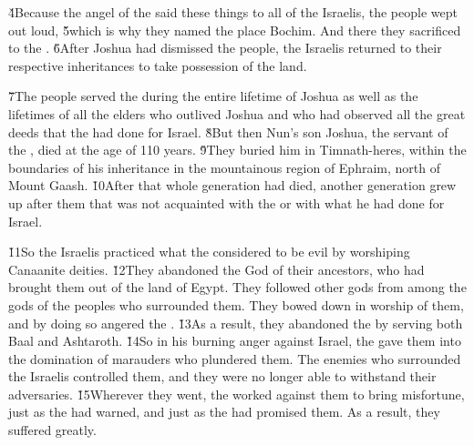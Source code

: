 \v{4}Because the angel of the  said these things to all of the Israelis, the people wept out loud, \v{5}which is why they named the place Bochim. And there they sacrificed to the . \v{6}After Joshua had dismissed the people, the Israelis returned to their respective inheritances to take possession of the land.

\v{7}The people served the  during the entire lifetime of Joshua as well as the lifetimes of all the elders who outlived Joshua and who had observed all the great deeds that the  had done for Israel. \v{8}But then Nun's son Joshua, the servant of the , died at the age of 110 years. \v{9}They buried him in Timnath-heres, within the boundaries of his inheritance in the mountainous region of Ephraim, north of Mount Gaash. \v{10}After that whole generation had died, another generation grew up after them that was not acquainted with the  or with what he had done for Israel.

\v{11}So the Israelis practiced what the  considered to be evil by worshiping Canaanite deities. \v{12}They abandoned the  God of their ancestors, who had brought them out of the land of Egypt. They followed other gods from among the gods of the peoples who surrounded them. They bowed down in worship of them, and by doing so angered the . \v{13}As a result, they abandoned the  by serving both Baal and Ashtaroth. \v{14}So in his burning anger against Israel, the  gave them into the domination of marauders who plundered them. The enemies who surrounded the Israelis controlled them, and they were no longer able to withstand their adversaries. \v{15}Wherever they went, the  worked against them to bring misfortune, just as the  had warned, and just as the  had promised them. As a result, they suffered greatly.

